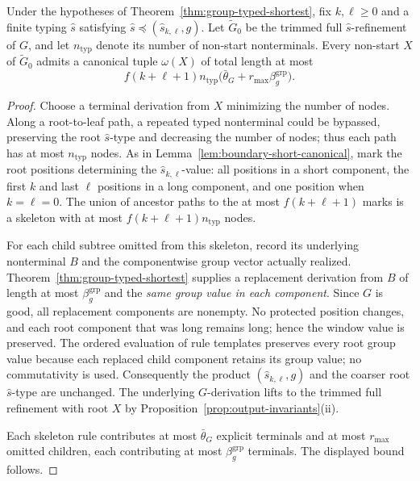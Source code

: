 \begin{lemma}
\label{lem:window-group-short}
Under the hypotheses of Theorem~\ref{thm:group-typed-shortest},
fix $k,\ell\ge0$ and a finite typing $\widehat{s}$ satisfying
$\widehat{s}\preceq(\widehat{s}_{k,\ell},g)$.
Let $\widetilde G_0$ be the trimmed full $\widehat{s}$-refinement
of $G$, and let $n_{\mathrm{typ}}$ denote its number of
non-start nonterminals.  Every non-start
$X$ of $\widetilde G_0$ admits a canonical tuple
$\omega(X)$ of total length at most
\[
 f(k+\ell+1)n_{\mathrm{typ}}
 \bigl(\bar\theta_G+r_{\max}\beta_g^{\mathrm{grp}}\bigr).
\]
\end{lemma}
\begin{proof}
Choose a terminal derivation from $X$ minimizing the
number of nodes.  Along a root-to-leaf path, a repeated
typed nonterminal could be bypassed, preserving the root
$\widehat{s}$-type and decreasing the number of nodes; thus
each path has at most $n_{\mathrm{typ}}$ nodes.
As in Lemma~\ref{lem:boundary-short-canonical},
mark the root positions determining the
$\widehat{s}_{k,\ell}$-value: all positions in a short
component, the first $k$ and last $\ell$ positions
in a long component, and one position when
$k=\ell=0$.  The union of ancestor paths to the
at most $f(k+\ell+1)$ marks is a skeleton with at most
$f(k+\ell+1)n_{\mathrm{typ}}$ nodes.

For each child subtree omitted from this skeleton,
record its underlying nonterminal $B$ and the
componentwise group vector actually realized.
Theorem~\ref{thm:group-typed-shortest} supplies
a replacement derivation from $B$ of length at most
$\beta_g^{\mathrm{grp}}$ and the \emph{same group
value in each component}.  Since $G$ is good,
all replacement components are nonempty.
No protected position changes, and each root
component that was long remains long; hence the
window value is preserved.  The ordered evaluation
of rule templates preserves every root group value
because each replaced child component retains its
group value; no commutativity is used.
Consequently the product $(\widehat{s}_{k,\ell},g)$
and the coarser root $\widehat{s}$-type are unchanged.
The underlying $G$-derivation lifts to the
trimmed full refinement with root $X$ by
Proposition~\ref{prop:output-invariants}(ii).

Each skeleton rule contributes at most
$\bar\theta_G$ explicit terminals and at most
$r_{\max}$ omitted children, each contributing at most
$\beta_g^{\mathrm{grp}}$ terminals.  The displayed
bound follows.
\end{proof}

